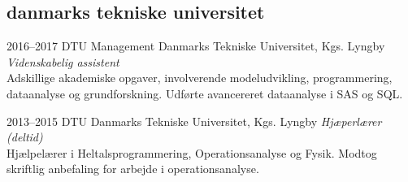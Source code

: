 \documentclass[]{../friggeri-cv} %
\begin{document}
\subsection{danmarks tekniske universitet}

\begin{entrylist}

\entry
{2016--2017}
{DTU Management}
{Danmarks Tekniske Universitet, Kgs. Lyngby}
{\emph{Videnskabelig assistent}\\
Adskillige akademiske opgaver, involverende modeludvikling, programmering, dataanalyse og grundforskning. Udførte avancereret dataanalyse i SAS og SQL.}

\entry
{2013--2015}
{DTU}
{Danmarks Tekniske Universitet, Kgs. Lyngby}
{\emph{Hjæperlærer (deltid)}\\
Hjælpelærer i Heltalsprogrammering, Operationsanalyse og Fysik. Modtog skriftlig anbefaling for arbejde i operationsanalyse.}

\end{entrylist}



\end{document}
